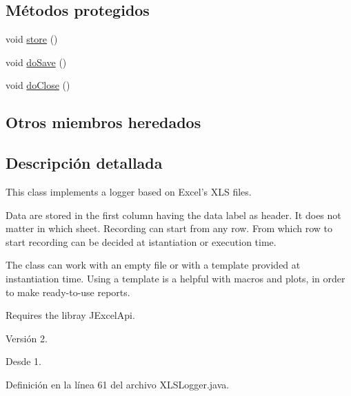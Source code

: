 \subsection*{Métodos protegidos}
\begin{DoxyCompactItemize}
\item 
void \hyperlink{classjenes_1_1utils_1_1_x_l_s_logger_ae6b3840ad6be8bdc558efaf6077d4ae4}{store} ()
\item 
void \hyperlink{classjenes_1_1utils_1_1_x_l_s_logger_a54c54393bf5a31442ebfc10517dfceea}{do\-Save} ()
\item 
void \hyperlink{classjenes_1_1utils_1_1_x_l_s_logger_acf58ddaa6873bcf626c9d24064a89b73}{do\-Close} ()
\end{DoxyCompactItemize}
\subsection*{Otros miembros heredados}


\subsection{Descripción detallada}
This class implements a logger based on Excel's X\-L\-S files.

Data are stored in the first column having the data label as header. It does not matter in which sheet. Recording can start from any row. From which row to start recording can be decided at istantiation or execution time.

The class can work with an empty file or with a template provided at instantiation time. Using a template is a helpful with macros and plots, in order to make ready-\/to-\/use reports.

Requires the libray J\-Excel\-Api.

\begin{DoxyVersion}{Versión}
2. 
\end{DoxyVersion}
\begin{DoxySince}{Desde}
1. 
\end{DoxySince}


Definición en la línea 61 del archivo X\-L\-S\-Logger.\-java.



